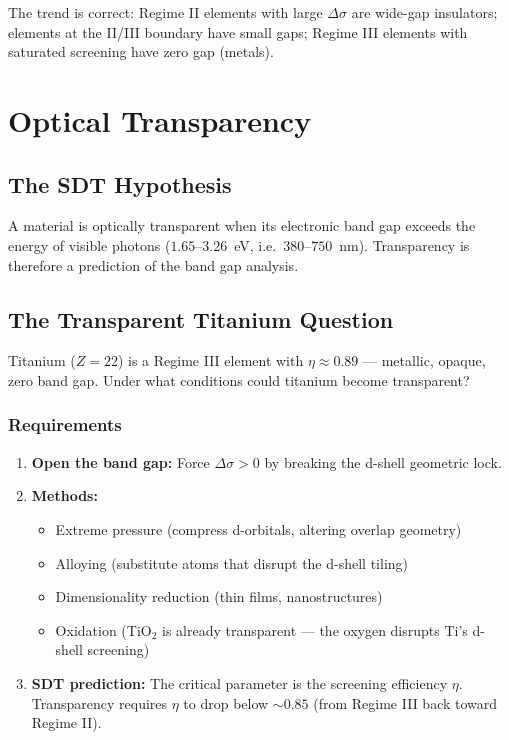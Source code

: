 \documentclass[12pt,a4paper]{report}
\begin{document}
The trend is correct: Regime II elements with large $\Delta\sigma$ are wide-gap insulators; elements at the II/III boundary have small gaps; Regime III elements with saturated screening have zero gap (metals).


\chapter{Optical Transparency}
\label{ch:transparency}

\section{The SDT Hypothesis}

A material is optically transparent when its electronic band gap exceeds the energy of visible photons ($1.65$--$3.26$~eV, i.e.\ $380$--$750$~nm). Transparency is therefore a prediction of the band gap analysis.

\section{The Transparent Titanium Question}

Titanium ($Z = 22$) is a Regime III element with $\eta \approx 0.89$ --- metallic, opaque, zero band gap. Under what conditions could titanium become transparent?

\subsection{Requirements}

\begin{enumerate}
  \item \textbf{Open the band gap:} Force $\Delta\sigma > 0$ by breaking the d-shell geometric lock.
  \item \textbf{Methods:}
    \begin{itemize}
      \item Extreme pressure (compress d-orbitals, altering overlap geometry)
      \item Alloying (substitute atoms that disrupt the d-shell tiling)
      \item Dimensionality reduction (thin films, nanostructures)
      \item Oxidation (TiO$_2$ is already transparent --- the oxygen disrupts Ti's d-shell screening)
    \end{itemize}
  \item \textbf{SDT prediction:} The critical parameter is the screening efficiency $\eta$. Transparency requires $\eta$ to drop below $\sim 0.85$ (from Regime III back toward Regime II).
\end{enumerate}
\end{document}
